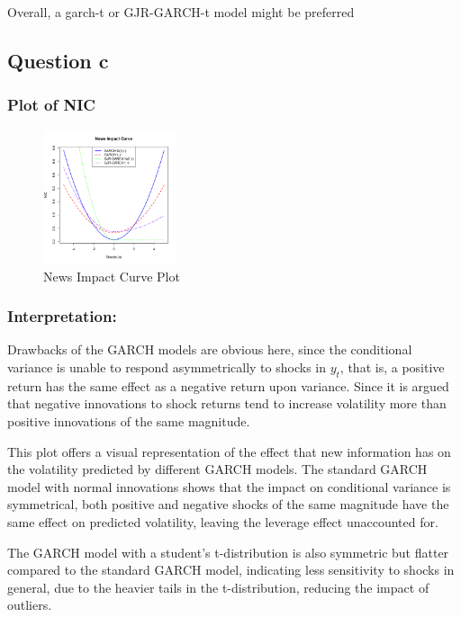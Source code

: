 \documentclass{article}
\begin{document}
Overall, a garch-t or GJR-GARCH-t model might be preferred


\subsection*{Question c}
\subsubsection*{Plot of NIC}
 
\begin{figure}[H]
    \centering
    \includegraphics[width=0.35\textwidth]{../../docs/figures/NIC.png}
    \caption{News Impact Curve Plot}
    \label{fig:logreturn}
\end{figure}

\subsubsection*{Interpretation:}
Drawbacks of the GARCH models are obvious here, since the conditional variance is unable to respond asymmetrically to shocks in $y_{t}$, that is, a positive return has the same effect as a negative return upon variance. Since it is argued that negative innovations to shock returns tend to increase volatility more than positive innovations of the same magnitude. 

This plot offers a visual representation of the effect that new information has on the volatility predicted by different GARCH models. 
The standard GARCH model with normal innovations shows that the impact on conditional variance is symmetrical, both positive and negative shocks of the same magnitude have the same effect on predicted volatility, leaving the leverage effect unaccounted for. 

The GARCH model with a student's t-distribution is also symmetric but flatter compared to the standard GARCH model, indicating less sensitivity to shocks in general, due to the heavier tails in the t-distribution, reducing the impact of outliers. 
\end{document}
